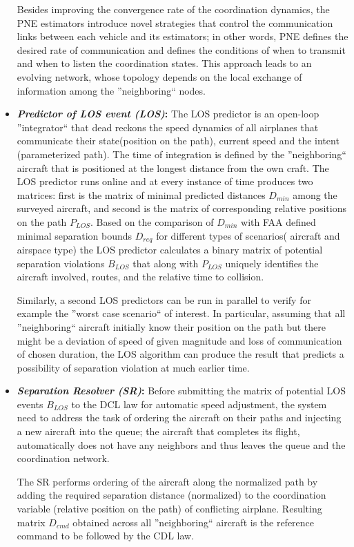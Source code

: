 \documentclass[letter,onecolumn,12pt]{aiaa-tc}
\newcommand{\1}{1_n}
\begin{document}
\begin{itemize}
Besides improving  the convergence rate of the coordination dynamics, the PNE estimators introduce novel strategies that control the communication links between each vehicle and its estimators; in other words, PNE defines the desired rate of communication and defines the conditions of when to transmit and when to listen the coordination states. This approach leads to an evolving network, whose topology depends on the local exchange of information among the ''neighboring`` nodes.

\item \textbf{\emph{Predictor of LOS event (LOS)}:} The LOS predictor is an open-loop ''integrator`` that dead reckons the speed dynamics of all airplanes that communicate their state(position on the path), current speed and the intent (parameterized path). The time of integration is defined by the ''neighboring`` aircraft that is positioned at the longest distance from the own craft. The LOS predictor runs online and at every instance of time produces two matrices: first is the matrix of minimal predicted distances $D_{min}$ among the surveyed aircraft, and second is the matrix of corresponding relative positions on the path $P_{LOS}$. Based on the comparison of $D_{min}$ with FAA defined minimal separation bounds $D_{req}$ for different types of scenarios( aircraft and airspace type) the LOS predictor calculates a binary matrix of potential separation violations $B_{LOS}$ that along with $P_{LOS}$ uniquely identifies the aircraft involved, routes, and the relative time to collision.

Similarly, a second LOS predictors can be run in parallel to verify for example the ''worst case scenario`` of interest. In particular, assuming that all ''neighboring`` aircraft initially know their  position on the path but there might be a deviation of speed of given magnitude and loss of communication of chosen duration, the LOS algorithm can produce the result that predicts a possibility of separation violation at much earlier time.

\item \textbf{\emph{Separation Resolver (SR)}:} Before submitting the matrix of potential LOS events $B_{LOS}$ to the DCL law for automatic speed adjustment, the system need to address the task of ordering the aircraft on their paths and injecting a new aircraft into the queue; the aircraft that completes its flight, automatically does not have any neighbors and thus leaves the queue and the coordination network.

The SR performs ordering of the aircraft along the normalized path by adding the required separation distance (normalized) to the coordination variable (relative position on the path) of conflicting airplane. Resulting matrix $D_{cmd}$ obtained across all ''neighboring`` aircraft is the reference command to be followed by the CDL law.


\end{itemize}
\end{document}
